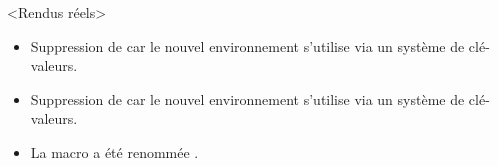 

\begin{bdoctopic}<Rendus réels>
    \begin{itemize}
        \item Suppression de  car le nouvel environnement  s'utilise via un sys\-tème de clé-valeurs.

        \item Suppression de  car le nouvel environnement  s'utilise via un système de clé-valeurs.

        \item La macro  a été renommée .
    \end{itemize}
\end{bdoctopic}
